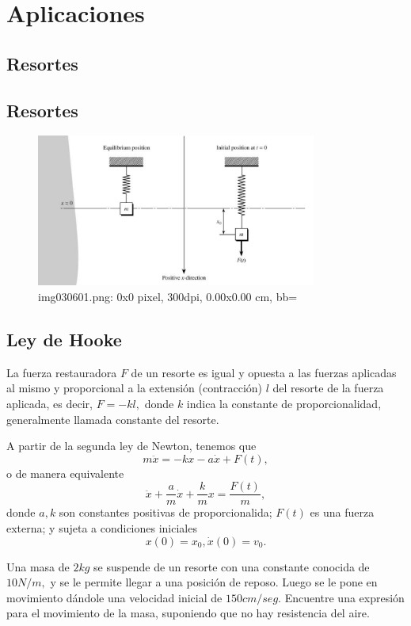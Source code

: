  \section{Aplicaciones}

\subsection{Resortes}


\subsection{Resortes}
\begin{figure}
	\centering
	\includegraphics[height=5cm,keepaspectratio=true]{./edo/img030601.png}
	img030601.png: 0x0 pixel, 300dpi, 0.00x0.00 cm, bb=
	\label{fig:030601}
\end{figure}




\subsection{Ley de Hooke}
La fuerza restauradora $F$ de un resorte es igual y opuesta a las fuerzas aplicadas al mismo y proporcional a la extensi\'on (contracci\'on) $l$ del resorte de la fuerza aplicada, es decir, $F=-kl,$ donde $k$ indica la constante de proporcionalidad, generalmente llamada constante del resorte.



A partir de la segunda ley de Newton, tenemos que $$m\ddot{x}=-kx-a\dot{x}+F(t),$$ o de manera equivalente
\[
	\label{bron:14.1}
	\ddot{x}+\dfrac{a}{m}\dot{x}+\dfrac{k}{m}x=\dfrac{F(t)}{m},
\]
donde $a,k$ son constantes positivas de proporcionalida; $F(t)$ es una fuerza externa; y sujeta a condiciones iniciales
\[
	\label{bron:14.2}
	x(0)=x_{0}, \dot{x}(0)=v_{0}.
\]




\begin{problema}
	\label{bron:exmp:14.2}
	Una masa de $2kg$ se suspende de un resorte con una constante conocida de $10N/m,$ y se le permite llegar a una posici\'on de reposo. Luego se le pone en movimiento dándole una velocidad inicial de $150cm/seg.$ Encuentre una expresi\'on para el movimiento de la masa, suponiendo que no hay resistencia del aire.
\end{problema}




